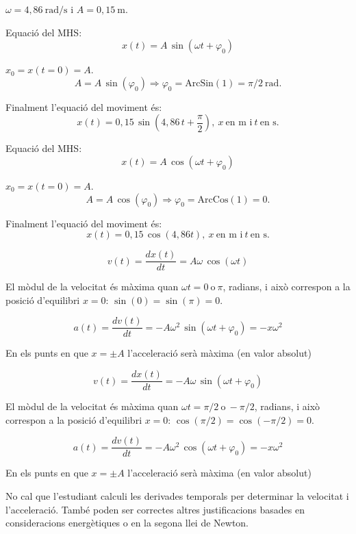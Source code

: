\begin{solapartat}
$\omega = 4,86\ \mathrm{rad/s}$ i $A = 0,15\ \mathrm{m}$.


 Equació del MHS:
\[ x(t) = A\,\sin(\omega t+\varphi_0) \]

 $x_0 = x(t=0) = A$.
\[ A = A\,\sin(\varphi_0) \Rightarrow \varphi_0 = \mathrm{ArcSin}(1) = \pi/2\ \mathrm{rad}. \]

 Finalment l'equació del moviment és:
\[ x(t) = 0,15\,\sin\!\left(4,86\,t+\frac{\pi}{2}\right),\ x\ \text{en m i}\ t\ \text{en s.} \]


 Equació del MHS:
\[ x(t) = A\,\cos(\omega t+\varphi_0) \]

 $x_0 = x(t=0) = A$.
\[ A = A\,\cos(\varphi_0) \Rightarrow \varphi_0 = \mathrm{ArcCos}(1) = 0. \]

 Finalment l'equació del moviment és:
\[ x(t) = 0,15\,\cos(4,86t),\ x\ \text{en m i}\ t\ \text{en s.} \]

\[ v(t) = \frac{dx(t)}{dt} = A\omega\,\cos(\omega t) \]

 El mòdul de la velocitat és màxima quan $\omega t = 0\ \text{o}\ \pi$, radians, i això correspon a la posició d'equilibri $x=0$: $\sin(0)=\sin(\pi)=0$.

\[ a(t) = \frac{dv(t)}{dt} = -A\omega^2\,\sin(\omega t+\varphi_0) = -x\omega^2 \]

 En els punts en que $x=\pm A$ l'acceleració serà màxima (en valor absolut)

\[ v(t) = \frac{dx(t)}{dt} = -A\omega\,\sin(\omega t+\varphi_0) \]

 El mòdul de la velocitat és màxima quan $\omega t = \pi/2\ \text{o}\ -\pi/2$, radians, i això correspon a la posició d'equilibri $x=0$: $\cos(\pi/2)=\cos(-\pi/2)=0$.

\[ a(t) = \frac{dv(t)}{dt} = -A\omega^2\,\cos(\omega t+\varphi_0) = -x\omega^2 \]

 En els punts en que $x=\pm A$ l'acceleració serà màxima (en valor absolut)

No cal que l'estudiant calculi les derivades temporals per determinar la velocitat i l'acceleració. També poden ser correctes altres justificacions basades en consideracions energètiques o en la segona llei de Newton.
\end{solapartat}
